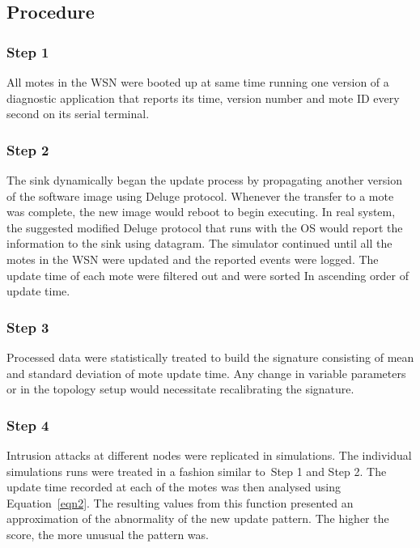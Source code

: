 \documentclass[conference]{IEEEtran}
\begin{document}
\subsection*{Procedure}
\label{subsec:proc}

\subsubsection*{Step 1} 
All motes in the WSN were booted up at same time running one version of a diagnostic application that reports its time, version number and mote ID every second on its serial terminal. 

\subsubsection*{Step 2} 
The sink dynamically began the update process by propagating another version of the software image using Deluge protocol. %
Whenever the transfer to a mote was complete, the new image would  reboot to begin executing.
In real system, the suggested modified Deluge protocol that runs with the OS would report the information to the sink using datagram.
The simulator continued until all the motes in the WSN were updated and the reported events were logged. 
The update time of each mote were filtered out  and were sorted In ascending order of update time.

\subsubsection*{Step 3} 
Processed data  were statistically treated to build the signature consisting of mean and standard deviation of  mote update time.
Any change in variable parameters or in the topology setup would necessitate recalibrating the signature.

\subsubsection*{Step 4} 
Intrusion attacks at different nodes were replicated in simulations.
The individual simulations runs were treated in a fashion  similar to~Step 1 and Step 2.
The update time recorded at each of the motes was then analysed using Equation~\ref{eqn2}.
The resulting values from this function presented an approximation of the abnormality of the new update pattern. The higher the score, the more unusual the pattern was. 
\end{document}
